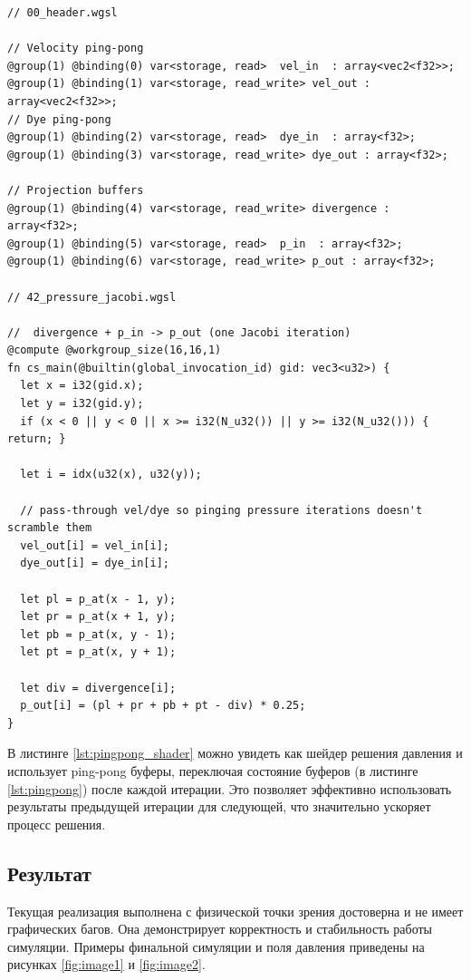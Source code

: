 \begin{lstlisting}[caption=Подключение буфферов и решение давления методом Якоби в WGSL, label={lst:pingpong_shader}]
// 00_header.wgsl

// Velocity ping-pong
@group(1) @binding(0) var<storage, read>  vel_in  : array<vec2<f32>>;
@group(1) @binding(1) var<storage, read_write> vel_out : array<vec2<f32>>;
// Dye ping-pong
@group(1) @binding(2) var<storage, read>  dye_in  : array<f32>;
@group(1) @binding(3) var<storage, read_write> dye_out : array<f32>;

// Projection buffers
@group(1) @binding(4) var<storage, read_write> divergence : array<f32>;
@group(1) @binding(5) var<storage, read>  p_in  : array<f32>;
@group(1) @binding(6) var<storage, read_write> p_out : array<f32>;

// 42_pressure_jacobi.wgsl

//  divergence + p_in -> p_out (one Jacobi iteration)
@compute @workgroup_size(16,16,1)
fn cs_main(@builtin(global_invocation_id) gid: vec3<u32>) {
  let x = i32(gid.x);
  let y = i32(gid.y);
  if (x < 0 || y < 0 || x >= i32(N_u32()) || y >= i32(N_u32())) { return; }

  let i = idx(u32(x), u32(y));

  // pass-through vel/dye so pinging pressure iterations doesn't scramble them
  vel_out[i] = vel_in[i];
  dye_out[i] = dye_in[i];

  let pl = p_at(x - 1, y);
  let pr = p_at(x + 1, y);
  let pb = p_at(x, y - 1);
  let pt = p_at(x, y + 1);

  let div = divergence[i];
  p_out[i] = (pl + pr + pb + pt - div) * 0.25;
}

\end{lstlisting}

В листинге \ref{lst:pingpong_shader} можно увидеть как шейдер решения давления и использует ping-pong буферы, переключая состояние буферов (в листинге \ref{lst:pingpong}) после каждой итерации. Это позволяет эффективно использовать результаты предыдущей итерации для следующей, что значительно ускоряет процесс решения.

\subsection{Результат}


Текущая реализация выполнена с физической точки зрения достоверна и не имеет графических багов. Она демонстрирует корректность и стабильность работы симуляции. Примеры финальной симуляции и поля давления приведены на рисунках \ref{fig:image1} и \ref{fig:image2}.


